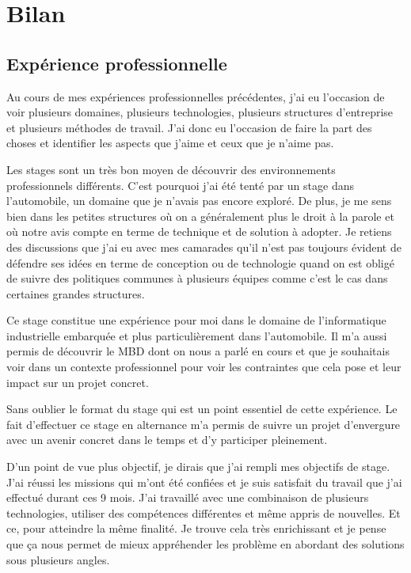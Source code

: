 \chapter{Bilan}

\section*{Expérience professionnelle}
Au cours de mes expériences professionnelles précédentes, j'ai eu l'occasion de
voir plusieurs domaines, plusieurs technologies, plusieurs structures
d'entreprise et plusieurs méthodes de travail. J'ai donc eu l'occasion de faire
la part des choses et identifier les aspects que j'aime et ceux que je n'aime
pas.

Les stages sont un très bon moyen de découvrir des environnements professionnels
différents. C'est pourquoi j'ai été tenté par un stage dans l'automobile, un
domaine que je n'avais pas encore exploré. De plus, je me sens bien dans les
petites structures où on a généralement plus le droit à la parole et où notre
avis compte en terme de technique et de solution à adopter. Je retiens des
discussions que j'ai eu avec mes camarades qu'il n'est pas toujours évident de
défendre ses idées en terme de conception ou de technologie quand on est obligé
de suivre des politiques communes à plusieurs équipes comme c'est le cas dans
certaines grandes structures.

Ce stage constitue une expérience pour moi dans le domaine de l'informatique
industrielle embarquée et plus particulièrement dans l'automobile. Il m'a aussi
permis de découvrir le MBD dont on nous a parlé en cours et que je souhaitais
voir dans un contexte professionnel pour voir les contraintes que cela pose et
leur impact sur un projet concret.

Sans oublier le format du stage qui est un point essentiel de cette expérience.
Le fait d'effectuer ce stage en alternance m'a permis de suivre un projet
d'envergure avec un avenir concret dans le temps et d'y participer pleinement.

D'un point de vue plus objectif, je dirais que j'ai rempli mes objectifs
de stage. J'ai réussi les missions qui m'ont été confiées et je suis satisfait
du travail que j'ai effectué durant ces 9 mois.  J'ai travaillé avec une
combinaison de plusieurs technologies, utiliser des compétences différentes et
même appris de nouvelles. Et ce, pour atteindre la même finalité. Je trouve cela
très enrichissant et je pense que ça nous permet de mieux appréhender les
problème en abordant des solutions sous plusieurs angles.

